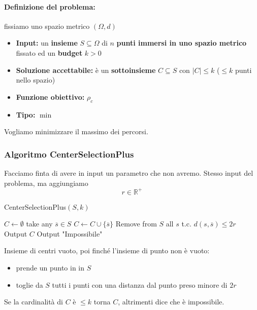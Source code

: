 \documentclass[11pt]{article}
\begin{document}
	\paragraph{Definizione del problema:} fissiamo uno spazio metrico $(\Omega, d)$
	\begin{itemize}
		\item \textbf{Input:} un \textbf{insieme} $S \subseteq \Omega$ di $n$ \textbf{punti immersi in uno spazio metrico} fissato ed un \textbf{budget} $k>0$
		
		\item \textbf{Soluzione accettabile:} è un \textbf{sottoinsieme} $C \subseteq S$ con $|C| \leq k$ ($\leq k$ punti nello spazio)
		
		\item \textbf{Funzione obiettivo:} $\rho_c$
		
		\item \textbf{Tipo:} $\min$
	\end{itemize}
	Vogliamo minimizzare il massimo dei percorsi.\\
	
	\subsubsection{Algoritmo CenterSelectionPlus} 
	Facciamo finta di avere in input un parametro che non avremo. Stesso input del problema, ma aggiungiamo 
	$$ r \in \mathbb{R}^+ $$
	
	\begin{algorithm}
		\caption{CenterSelectionPlus$(S, k)$}
		\begin{algorithmic}
			\STATE $C \leftarrow \emptyset$
				\STATE take any $\overline{s} \in S$
				\STATE $C \leftarrow C \cup \{\overline{s}\}$
				\STATE Remove from $S$ all $s$ t.c. $d(s, \overline{s}) \leq 2r$
			\ENDWHILE
				\STATE Output $C$
			\ELSE
				\STATE Output "Impossibile"
			\ENDIF
		\end{algorithmic}
	\end{algorithm}
	
	Insieme di centri vuoto, poi finché l'insieme di punto non è vuoto: 
	\begin{itemize}
		\item prende un punto in in $S$
		\item toglie da $S$ tutti i punti con una distanza dal punto preso minore di $2r$
	\end{itemize}
	
	Se la cardinalità di $C$ è $\leq k$ torna $C$, altrimenti dice che è impossibile.\\
	
\end{document}
